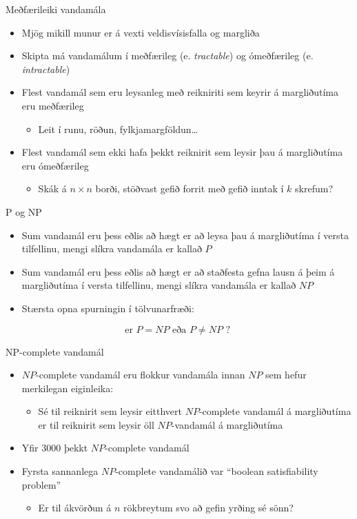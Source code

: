 \documentclass[handout]{beamer}
\begin{document}
\begin{frame}{Meðfærileiki vandamála}
\begin{itemize}
 \item Mjög mikill munur er á vexti veldisvísisfalla og margliða
 \item Skipta má vandamálum í meðfærileg (e. \emph{tractable}) og ómeðfærileg (e. \emph{intractable})
 \item Flest vandamál sem eru leysanleg með reikniriti sem keyrir á margliðutíma eru meðfærileg
 \begin{itemize}
  \item Leit í runu, röðun, fylkjamargföldun\ldots
 \end{itemize}
 \item Flest vandamál sem ekki hafa þekkt reiknirit sem leysir þau á margliðutíma eru ómeðfærileg
 \begin{itemize}
  \item Skák á $n \times n$ borði, stöðvast gefið forrit með gefið inntak í $k$ skrefum?
 \end{itemize}
\end{itemize}
\end{frame}

\begin{frame}{P og NP}
\begin{itemize}
 \item Sum vandamál eru þess eðlis að hægt er að leysa þau á margliðutíma í versta tilfellinu, mengi slíkra vandamála er kallað $P$
 \item Sum vandamál eru þess eðlis að hægt er að staðfesta gefna lausn á þeim á margliðutíma í versta tilfellinu, mengi slíkra vandamála er kallað $NP$
 \item Stærsta opna spurningin í tölvunarfræði:
\end{itemize}
\[
 \text{er } P = NP \text { eða } P \neq NP \text{ ? }
\]
\end{frame}

\begin{frame}{NP-complete vandamál}
\begin{itemize}
 \item $NP$-complete vandamál eru flokkur vandamála innan $NP$ sem hefur merkilegan eiginleika:
 \begin{itemize}
  \item Sé til reiknirit sem leysir eitthvert $NP$-complete vandamál á margliðutíma er til reiknirit sem leysir öll $NP$-vandamál á margliðutíma
 \end{itemize}
 \item Yfir 3000 þekkt $NP$-complete vandamál
 \item Fyrsta sannanlega $NP$-complete vandamálið var ``boolean satisfiability problem''
 \begin{itemize}
  \item Er til ákvörðun á $n$ rökbreytum svo að gefin yrðing sé sönn?
 \end{itemize}
\end{itemize}
\end{frame}
\end{document}
